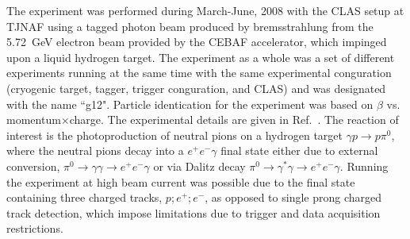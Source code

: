 \documentclass[aps,prc,twocolumn,floatfix,showpacs,preprintnumbers,amsmath,amssymb,superscriptaddress,linenumbers]{revtex4-1}
\begin{document}

The experiment was performed during March-June, 2008
with the CLAS setup at TJNAF using a tagged photon beam produced by 
bremsstrahlung from the 5.72~GeV electron beam provided by the CEBAF 
accelerator, which impinged upon a liquid hydrogen target. 
The experiment as a whole was a set of different 
experiments running at the same time with the same experimental 
conguration (cryogenic target, tagger, trigger conguration, and CLAS) 
and was designated with the name ``g12". Particle identication for 
the experiment was based on $\beta$ vs. momentum$\times$charge.
The experimental details are given in Ref.~\cite{g12}. The reaction 
of interest is the photoproduction of neutral pions on a hydrogen 
target $\gamma p\rightarrow p\pi^0$, 
where the neutral pions decay into a $e^+e^-\gamma$ final state either due to external conversion, $\pi^0 \rightarrow\gamma\gamma 
\rightarrow e^+e^-\gamma$ or via Dalitz decay $\pi^0
\rightarrow\gamma^\ast\gamma\rightarrow e^+e^-\gamma$. Running the 
experiment at high beam current was possible due to the final state 
containing three charged tracks, $p;e^+;e^-$, as opposed to single 
prong charged track detection, which impose limitations due to trigger 
and data acquisition restrictions.

\end{document}
